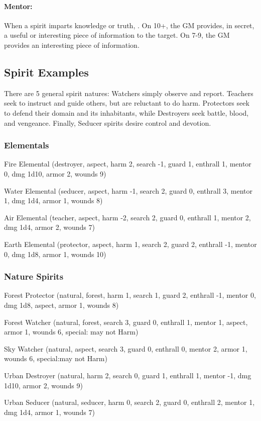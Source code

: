 \paragraph{Mentor:} When a spirit imparts knowledge or truth, . On 10+, the GM provides, in secret, a useful or interesting piece of information to the target. On 7-9, the GM provides an interesting piece of information.


\subsection{Spirit Examples}
There are 5 general spirit natures: Watchers simply observe and report. Teachers seek to instruct and guide others, but are reluctant to do harm. Protectors seek to defend their domain and its inhabitants, while Destroyers seek battle, blood, and vengeance. Finally, Seducer spirits desire control and devotion.

\subsubsection{Elementals}
Fire Elemental (destroyer, aspect, harm 2, search -1, guard 1, enthrall 1, mentor 0, dmg 1d10, armor 2, wounds 9)

Water Elemental (seducer, aspect, harm -1, search 2, guard 0, enthrall 3, mentor 1, dmg 1d4, armor 1, wounds 8)

Air Elemental (teacher, aspect, harm -2, search 2, guard 0, enthrall 1, mentor 2, dmg 1d4, armor 2, wounds 7)

Earth Elemental (protector, aspect, harm 1, search 2, guard 2, enthrall -1, mentor 0, dmg 1d8, armor 1, wounds 10)

\subsubsection{Nature Spirits}
Forest Protector (natural, forest, harm 1, search 1, guard 2, enthrall -1, mentor 0, dmg 1d8, aspect, armor 1, wounds 8)

Forest Watcher (natural, forest, search 3, guard 0, enthrall 1, mentor 1, aspect, armor 1, wounds 6, special: may not Harm)

Sky Watcher (natural, aspect, search 3, guard 0, enthrall 0, mentor 2, armor 1, wounds 6, special:may not Harm)

Urban Destroyer (natural, harm 2, search 0, guard 1, enthrall 1, mentor -1, dmg 1d10, armor 2, wounds 9)

Urban Seducer (natural, seducer, harm 0, search 2, guard 0, enthrall 2, mentor 1, dmg 1d4, armor 1, wounds 7)

